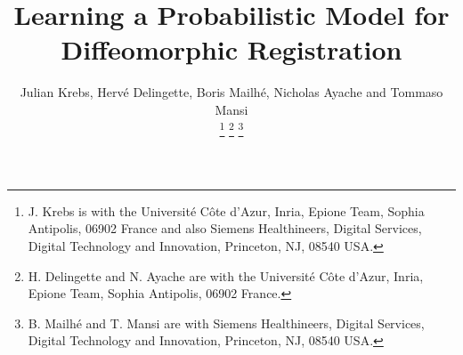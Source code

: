 \documentclass[journal]{IEEEtran}
\begin{document}
%
\title{Learning a Probabilistic Model for \\ Diffeomorphic Registration}
%
%
%
\author{Julian Krebs, Herv\'{e} Delingette, Boris Mailh\'{e}, Nicholas Ayache and Tommaso Mansi

\thanks{J. Krebs is with the Universit\'{e} C\^{o}te d'Azur, Inria, Epione Team, Sophia Antipolis, 06902 France and also Siemens Healthineers, Digital Services, Digital Technology and Innovation, Princeton, NJ, 08540 USA.}%
\thanks{H. Delingette and N. Ayache are with the Universit\'{e} C\^{o}te d'Azur, Inria, Epione Team, Sophia Antipolis, 06902 France.}%
\thanks{B. Mailh\'{e} and T. Mansi are with Siemens Healthineers, Digital Services, Digital Technology and Innovation, Princeton, NJ, 08540 USA.}%
}



\maketitle
\end{document}
